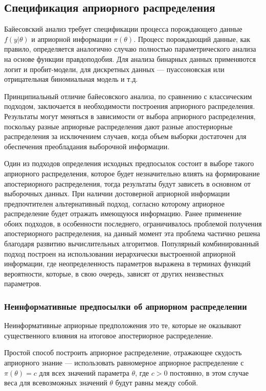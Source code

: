 \subsection{Спецификация априорного распределения}

Байесовский анализ требует спецификации процесса порождающего данные $f(y|\theta)$ и априорной информации $\pi(\theta)$. Процесс порождающий данные, как правило, определяется аналогично случаю полностью параметрического анализа на основе функции правдоподобия. Для анализа бинарных данных применяются логит и пробит-модели, для дискретных данных --- пуассоновская или отрицательная биномиальная модель и т.д.

Принципиальный отличие байесовского анализа, по сравнению с классическим подходом, заключается в необходимости построения априорного распределения. Результаты могут меняться в зависимости от выбора априорного распределения, поскольку разные априорные распределения дают разные апостериорные распределения за исключением случаев, когда объем выборки достаточен для обеспечения преобладания  выборочной информации.

Один из подходов определения исходных предпосылок состоит в выборе такого априорного распределения, которое будет незначительно влиять на формирование апостериорного распределения, тогда результаты будут зависеть в основном от выборочных данных. При наличии достоверной априорной информации предпочтителен  альтернативный подход, согласно которому априорное распределение будет отражать имеющуюся информацию. Ранее применение обоих подходов, в особенности последнего, ограничивалось проблемой  получения апостериорного распределения, на данный момент эта проблема частично решена благодаря развитию вычислительных алгоритмов. Популярный комбинированный подход построен на использовании иерархически выстроенной априорной информации, где неопределенность параметров выражена в терминах функций вероятности, которые, в свою очередь, зависят от других неизвестных параметров. 

\subsubsection*{Неинформативные предпосылки об априорном распределении}

Неинформативные априорные предположения это те, которые не оказывают существенного влияния на итоговое апостериорное распределение.

Простой способ построить априорное распределение, отражающее скудость априорного знание --- использовать равномерное априорное распределение с $\pi(\theta)=c$ для всех значений параметра $\theta$, где $c>0$ постоянно, в этом случае веса для всевозможных значений $\theta$ будут равны между собой.

